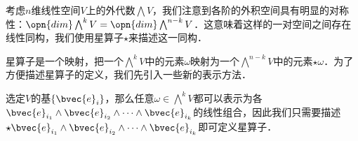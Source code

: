 

考虑$n$维线性空间$V$上的外代数$\bigwedge V$，我们注意到各阶的外积空间具有明显的对称性：$\opn{dim}\bigwedge^k V=\opn{dim}\bigwedge^{n-k} V$．这意味着这样的一对空间之间存在线性同构，我们使用星算子$\star$来描述这一同构．

星算子是一个映射，把一个$\bigwedge^k V$中的元素$\omega$映射为一个$\bigwedge^{n-k} V$中的元素$\star\omega$．为了方便描述星算子的定义，我们先引入一些新的表示方法．

选定$V$的基$\{\bvec{e}_i\}$，那么任意$\omega\in\bigwedge^k V$都可以表示为各$\bvec{e}_{i_1}\wedge\bvec{e}_{i_2}\wedge\cdots\wedge\bvec{e}_{i_k}$的线性组合，因此我们只需要描述$\star\bvec{e}_{i_1}\wedge\bvec{e}_{i_2}\wedge\cdots\wedge\bvec{e}_{i_k}$即可定义星算子．





